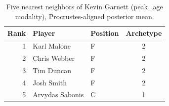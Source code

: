 \begin{table}[htbp]
  \centering\small
  \begin{tabular}{rllc}
    \toprule
    Rank & Player & Position & Archetype \\
    \midrule
    1 & Karl Malone & F & 2 \\
    2 & Chris Webber & F & 2 \\
    3 & Tim Duncan & F & 2 \\
    4 & Josh Smith & F & 2 \\
    5 & Arvydas Sabonis & C & 1 \\
    \bottomrule
  \end{tabular}
  \caption{Five nearest neighbors of Kevin Garnett (peak_age modality), Procrustes-aligned posterior mean.}
  \label{tab:Kevin_Garnett_neighbors_peak_age}
\end{table}

